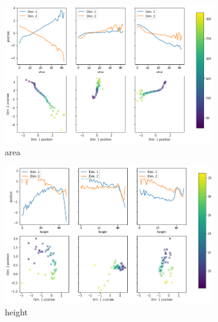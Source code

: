 \begin{figure}
    \centering
    \begin{subfigure}{.48\textwidth}
        \includegraphics[width=\textwidth]{images/latent_space_traversals/vlae_mnist_morpho_latent_space_values_area.png}
        \caption{area}
    \end{subfigure}
    \hfill
    \begin{subfigure}{.48\textwidth}
        \includegraphics[width=\textwidth]{images/latent_space_traversals/vlae_mnist_morpho_latent_space_values_height.png}
        \caption{height}
    \end{subfigure}
    \begin{subfigure}{.48\textwidth}

\end{subfigure}
\end{figure}
